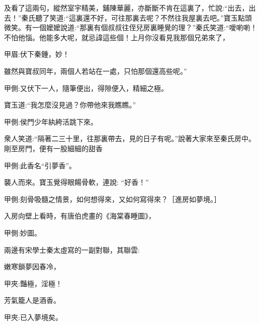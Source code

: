 \begin{parag}
    及看了這兩句，縱然室宇精美，鋪陳華麗，亦斷斷不肯在這裏了，忙說:“出去，出去！”秦氏聽了笑道:“這裏還不好，可往那裏去呢？不然往我屋裏去吧。”寶玉點頭微笑。有一個嬤嬤說道:“那裏有個叔叔往侄兒房裏睡覺的理？”秦氏笑道:“噯喲喲！不怕他惱。他能多大呢，就忌諱這些個！上月你沒看見我那個兄弟來了，\begin{note}甲眉:伏下秦鍾，妙！\end{note}雖然與寶叔同年，兩個人若站在一處，只怕那個還高些呢。”\begin{note}甲側:又伏下一人，隨筆便出，得隙便入，精細之極。\end{note}寶玉道:“我怎麼沒見過？你帶他來我瞧瞧。”\begin{note}甲側:侯門少年紈絝活跳下來。\end{note}衆人笑道:“隔著二三十里，往那裏帶去，見的日子有呢。”說著大家來至秦氏房中。剛至房門，便有一股細細的甜香\begin{note}甲側:此香名“引夢香”。\end{note}襲人而來。寶玉覺得眼餳骨軟，連說: “好香！”\begin{note}甲側:刻骨吸髓之情景，如何想得來，又如何寫得來？［進房如夢境。］\end{note}入房向壁上看時，有唐伯虎畫的《海棠春睡圖》，\begin{note}甲側:妙圖。\end{note}兩邊有宋學士秦太虛寫的一副對聯，其聯雲:
\end{parag}


\begin{poem}
    \begin{pl}嫩寒鎖夢因春冷，\end{pl}
    \begin{note}甲夾:豔極，淫極！\end{note}

    \begin{pl}芳氣籠人是酒香。\end{pl}
    \begin{note}甲夾:已入夢境矣。\end{note}

\end{poem}


